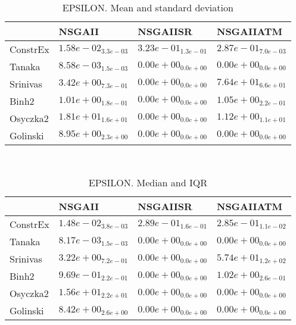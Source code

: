 \documentclass{article}
\begin{document}
\
\begin{table}
\caption{EPSILON. Mean and standard deviation}
\label{table:mean.EPSILON}
\centering
\begin{scriptsize}
\begin{tabular}{llll}
\hline & NSGAII & NSGAIISR &  NSGAIIATM\\
\hline
ConstrEx & \cellcolor{gray95}$  1.58e-02_{ 3.3e-03}$ & $  3.23e-01_{ 1.3e-01}$ & $  2.87e-01_{ 7.0e-03}$ \\
Tanaka & $  8.58e-03_{ 1.5e-03}$ & \cellcolor{gray95}$  0.00e+00_{ 0.0e+00}$ & $  0.00e+00_{ 0.0e+00}$ \\
Srinivas & \cellcolor{gray25}$  3.42e+00_{ 7.3e-01}$ & \cellcolor{gray95}$  0.00e+00_{ 0.0e+00}$ & $  7.64e+01_{ 6.6e+01}$ \\
Binh2 & \cellcolor{gray25}$  1.01e+00_{ 1.8e-01}$ & \cellcolor{gray95}$  0.00e+00_{ 0.0e+00}$ & $  1.05e+00_{ 2.2e-01}$ \\
Osyczka2 & $  1.81e+01_{ 1.6e+01}$ & \cellcolor{gray95}$  0.00e+00_{ 0.0e+00}$ & $  1.12e+00_{ 1.1e+01}$ \\
Golinski & $  8.95e+00_{ 2.3e+00}$ & \cellcolor{gray95}$  0.00e+00_{ 0.0e+00}$ & $  0.00e+00_{ 0.0e+00}$ \\
\hline
\end{tabular}
\end{scriptsize}
\end{table}
\
\begin{table}
\caption{EPSILON. Median and IQR}
\label{table:median.EPSILON}
\begin{scriptsize}
\centering
\begin{tabular}{llll}
\hline & NSGAII & NSGAIISR &  NSGAIIATM\\
\hline
ConstrEx & \cellcolor{gray95}$  1.48e-02_{ 3.8e-03}$ & $  2.89e-01_{ 1.6e-01}$ & $  2.85e-01_{ 1.1e-02}$ \\
Tanaka & $  8.17e-03_{ 1.5e-03}$ & \cellcolor{gray95}$  0.00e+00_{ 0.0e+00}$ & $  0.00e+00_{ 0.0e+00}$ \\
Srinivas & \cellcolor{gray25}$  3.22e+00_{ 7.2e-01}$ & \cellcolor{gray95}$  0.00e+00_{ 0.0e+00}$ & $  5.74e+01_{ 1.2e+02}$ \\
Binh2 & \cellcolor{gray25}$  9.69e-01_{ 2.2e-01}$ & \cellcolor{gray95}$  0.00e+00_{ 0.0e+00}$ & $  1.02e+00_{ 2.6e-01}$ \\
Osyczka2 & $  1.56e+01_{ 2.2e+01}$ & \cellcolor{gray95}$  0.00e+00_{ 0.0e+00}$ & $  0.00e+00_{ 0.0e+00}$ \\
Golinski & $  8.42e+00_{ 2.6e+00}$ & \cellcolor{gray95}$  0.00e+00_{ 0.0e+00}$ & $  0.00e+00_{ 0.0e+00}$ \\
\hline
\end{tabular}
\end{scriptsize}
\end{table}
\end{document}
